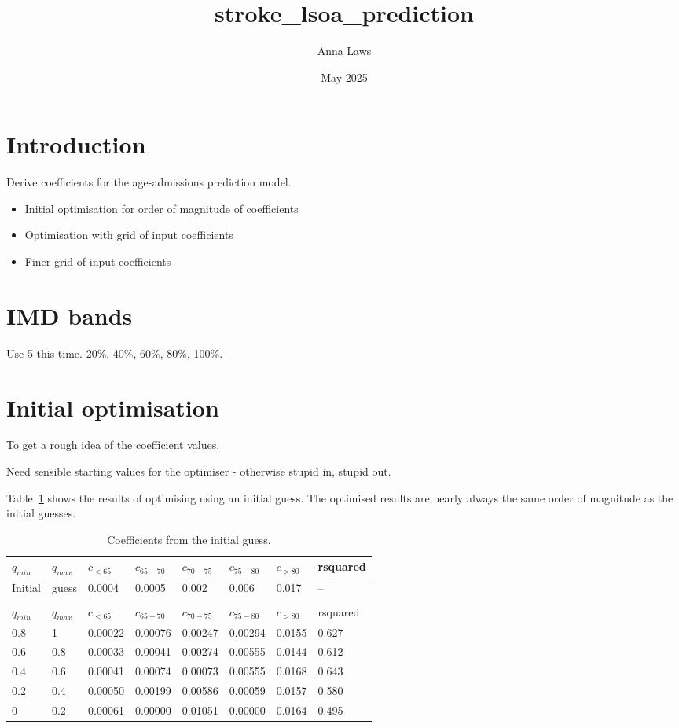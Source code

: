 \documentclass[12pt]{extarticle}
\title{stroke\_lsoa\_prediction}
\author{Anna Laws}
\date{May 2025}
\begin{document}
\maketitle

\section{Introduction}

Derive coefficients for the age-admissions prediction model.

\begin{itemize}
    \item Initial optimisation for order of magnitude of coefficients
    \item Optimisation with grid of input coefficients
    \item Finer grid of input coefficients
\end{itemize}

\section{IMD bands}

Use 5 this time. 20\%, 40\%, 60\%, 80\%, 100\%.

\section{Initial optimisation}

To get a rough idea of the coefficient values.

Need sensible starting values for the optimiser - otherwise stupid in, stupid out.

Table~\ref{tab:initial_guess} shows the results of optimising using an initial guess. The optimised results are nearly always the same order of magnitude as the initial guesses.

\begin{table}[h]
    \centering
    \begin{tabular}{l l l l l l l l}
    $q_{min}$ & $q_{max}$ & $c_{<65}$ & $c_{65-70}$ & $c_{70-75}$ & $c_{75-80}$ & $c_{>80}$ & rsquared \\
    \hline
    Initial & guess &  0.0004 & 0.0005 & 0.002 & 0.006 & 0.017 & -- \\
    \hline
    \\
    $q_{min}$ & $q_{max}$ & c$_{<65}$ & $c_{65-70}$ & $c_{70-75}$ & $c_{75-80}$ & $c_{>80}$ & rsquared \\
    \hline
    0.8 & 1 & 0.00022 & 0.00076 & 0.00247 & 0.00294 & 0.0155 & 0.627 \\
    0.6 & 0.8 & 0.00033 & 0.00041 & 0.00274 & 0.00555 & 0.0144 & 0.612 \\
    0.4 & 0.6 & 0.00041 & 0.00074 & 0.00073 & 0.00555 & 0.0168 & 0.643 \\
    0.2 & 0.4 & 0.00050 & 0.00199 & 0.00586 & 0.00059 & 0.0157 & 0.580 \\
    0 & 0.2 & 0.00061 & 0.00000 & 0.01051 & 0.00000 & 0.0164 & 0.495 \\
    \end{tabular}
    \caption{Coefficients from the initial guess.}
    \label{tab:initial_guess}
\end{table}
\end{document}
